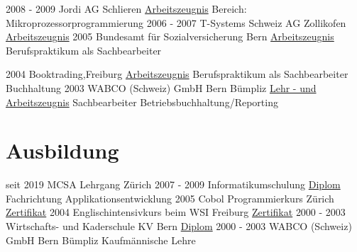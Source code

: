 \documentclass[a4paper]{twentysecondcv} %
\begin{document}
\begin{twenty}
{        }
        \twentyitem
        {}
        {}
        {}
        {}
        {}
        {}
        \twentyitem
        {2008 - 2009}
        {}
        {Jordi AG \textnormal{Schlieren}}
        {\hyperlink{jordi}{\textcolor{pblue}{Arbeitszeugnis}}}
        {Bereich: Mikroprozessorprogrammierung}
        {}
        \twentyitem
        {2006 - 2007}
        {}
        {T-Systems Schweiz AG \textnormal{Zollikofen}}
        {\hyperlink{tsystems}{\textcolor{pblue}{Arbeitszeugnis}}}
        {}
        {}
        \twentyitem
        {2005}
        {}
        {Bundesamt für Sozialversicherung \textnormal{Bern}}
        {\hyperlink{bsv}{\textcolor{pblue}{Arbeitszeugnis}}}
        {Berufspraktikum als Sachbearbeiter}
        {}

        \twentyitem
        {2004}
        {}
        {Booktrading,\textnormal{Freiburg}}
        {\hyperlink{booktrading}{\textcolor{pblue}{Arbeitszeugnis}}}
        {Berufspraktikum als Sachbearbeiter Buchhaltung}
        {}
        \twentyitem
        {2003}
        {}
        {WABCO (Schweiz) GmbH \textnormal{Bern Bümpliz}}
        {\hyperlink{wabco}{\textcolor{pblue}{Lehr - und Arbeitszeugnis}}}
        {Sachbearbeiter Betriebsbuchhaltung/Reporting}
        {}
    \end{twenty}
    \hypertarget{cert_back}{}
    \section{Ausbildung}
    \begin{twenty} %
        \twentyitem
        {seit 2019}
        {}
        {MCSA Lehrgang \textnormal{Zürich}}
        {}
        {}
        {}
        \twentyitem
        {2007 - 2009}
        {}
        {Informatikumschulung}
        {\hyperlink{informatik}{\textcolor{pblue}{Diplom}}}
        {Fachrichtung Applikationsentwicklung}
        {}
        \twentyitem
        {2005}
        {}
        {Cobol Programmierkurs \textnormal{Zürich}}
        {\hyperlink{cobol}{\textcolor{pblue}{Zertifikat}}}
        {}
        {}
        \twentyitem
        {2004}
        {}
        {Englischintensivkurs beim WSI \textnormal{Freiburg}}
        {\hyperlink{toeic}{\textcolor{pblue}{Zertifikat}}}
        {}
        {}
        \twentyitem
        {2000 - 2003}
        {}
        {Wirtschafts- und Kaderschule \textnormal{KV Bern}}
        {\hyperlink{kv}{\textcolor{pblue}{Diplom}}}
        {}
        {}
        \twentyitem
        {2000 - 2003}
        {}
        {WABCO (Schweiz) GmbH \textnormal{Bern Bümpliz}}
        {}
        {Kaufmännische Lehre}
        {}	%
    \end{twenty}
\end{document}
